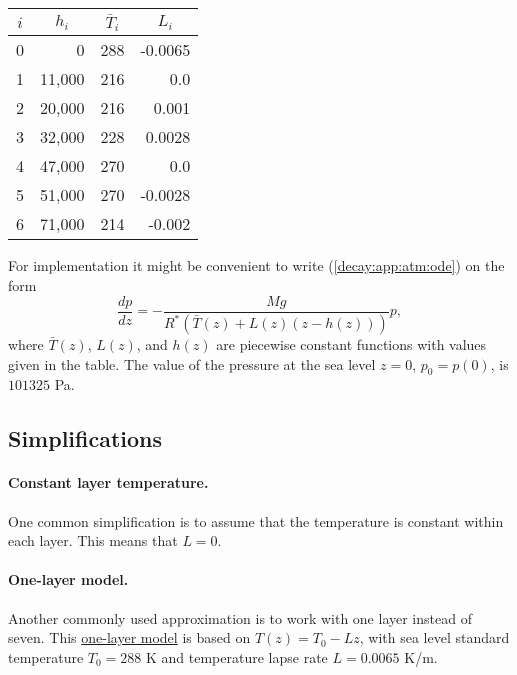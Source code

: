 \documentclass[graybox,sectrefs,envcountresetchap,open=right,final]{svmonodo}
\begin{document}
{\small   %

\vspace{4mm}

\begin{tabular}{lrrr}
\hline
\multicolumn{1}{c}{ $i$ } & \multicolumn{1}{c}{ $h_i$ } & \multicolumn{1}{c}{ $\bar T_i$ } & \multicolumn{1}{c}{ $L_i$ } \\
\hline
0   & 0      & 288        & -0.0065 \\
1   & 11,000 & 216        & 0.0     \\
2   & 20,000 & 216        & 0.001   \\
3   & 32,000 & 228        & 0.0028  \\
4   & 47,000 & 270        & 0.0     \\
5   & 51,000 & 270        & -0.0028 \\
6   & 71,000 & 214        & -0.002  \\
\hline
\end{tabular}

\vspace{4mm}

}


\noindent
For implementation it might be convenient to write (\ref{decay:app:atm:ode})
on the form
\begin{equation}
\frac{dp}{dz} = -\frac{Mg}{R^*(\bar T(z) + L(z)(z-h(z)))} p,
\end{equation}
where $\bar T(z)$, $L(z)$, and $h(z)$ are piecewise constant
functions with values given in the table.
The value of the pressure at the sea level $z=0$, $p_0=p(0)$, is $101325$ Pa.

\subsection{Simplifications}

\paragraph{Constant layer temperature.}
One common simplification is to assume that the temperature is
constant within each layer. This means that $L=0$.

\paragraph{One-layer model.}
Another commonly used approximation is to work with one layer instead of
seven. This \href{{http://en.wikipedia.org/wiki/Density_of_air}}{one-layer model}
is based on $T(z)=T_0 - Lz$, with
sea level standard temperature $T_0=288$ K and
temperature lapse rate $L=0.0065$ K/m.
\end{document}
